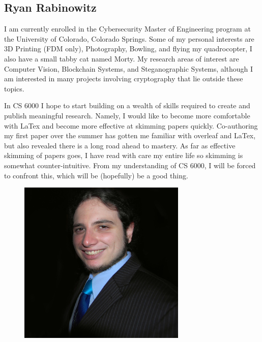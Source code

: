 \subsection{Ryan Rabinowitz}

I am currently enrolled in the Cybersecurity Master of Engineering program at the University of Colorado, Colorado Springs. Some of my personal interests are 3D Printing (FDM only), Photography, Bowling, and flying my quadrocopter, I also have a small tabby cat named Morty. 
My research areas of interest are Computer Vision, Blockchain Systems, and Steganographic Systems, although I am interested in many projects involving cryptography that lie outside these topics. 

In CS 6000 I hope to start building on a wealth of skills required to create and publish meaningful research. Namely, I would like to become more comfortable with LaTex and become more effective at skimming papers quickly. 
Co-authoring my first paper over the summer has gotten me familiar with overleaf and LaTex, but also revealed there is a long road ahead to mastery. As far as effective skimming of papers goes, I have read with care my entire life so skimming is somewhat counter-intuitive. 
From my understanding of CS 6000, I will be forced to confront this, which will be (hopefully) be a good thing.

\begin{figure}[h]
\includegraphics[width=8cm]{Rabinowitz_Headshot.jpg}
\end{figure}